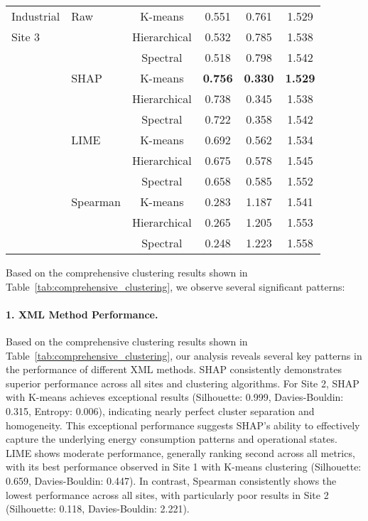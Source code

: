 \documentclass[final,5p,times,twocolumn,numbers]{elsarticle}
\begin{document}
\begin{table*}[t!]
\begin{tabular}{llcccc}
\hline
Industrial & Raw & K-means & 0.551 & 0.761 & 1.529 \\
Site 3 & & Hierarchical & 0.532 & 0.785 & 1.538 \\
      & & Spectral & 0.518 & 0.798 & 1.542 \\
      & SHAP & K-means & \textbf{0.756} & \textbf{0.330} & \textbf{1.529} \\
      & & Hierarchical & 0.738 & 0.345 & 1.538 \\
      & & Spectral & 0.722 & 0.358 & 1.542 \\
      & LIME & K-means & 0.692 & 0.562 & 1.534 \\
      & & Hierarchical & 0.675 & 0.578 & 1.545 \\
      & & Spectral & 0.658 & 0.585 & 1.552 \\
      & Spearman & K-means & 0.283 & 1.187 & 1.541 \\
      & & Hierarchical & 0.265 & 1.205 & 1.553 \\
      & & Spectral & 0.248 & 1.223 & 1.558 \\
\hline
\end{tabular}
\end{table*}

Based on the comprehensive clustering results shown in Table~\ref{tab:comprehensive_clustering}, we observe several significant patterns:

\paragraph{1. XML Method Performance.}
Based on the comprehensive clustering results shown in Table~\ref{tab:comprehensive_clustering}, our analysis reveals several key patterns in the performance of different XML methods. SHAP consistently demonstrates superior performance across all sites and clustering algorithms. For Site 2, SHAP with K-means achieves exceptional results (Silhouette: 0.999, Davies-Bouldin: 0.315, Entropy: 0.006), indicating nearly perfect cluster separation and homogeneity. This exceptional performance suggests SHAP's ability to effectively capture the underlying energy consumption patterns and operational states. LIME shows moderate performance, generally ranking second across all metrics, with its best performance observed in Site 1 with K-means clustering (Silhouette: 0.659, Davies-Bouldin: 0.447). In contrast, Spearman consistently shows the lowest performance across all sites, with particularly poor results in Site 2 (Silhouette: 0.118, Davies-Bouldin: 2.221).
\end{document}
